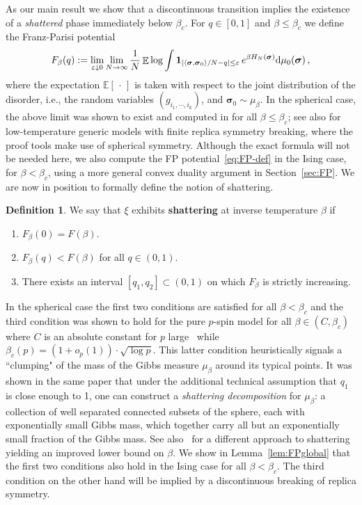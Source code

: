 \documentclass[11pt]{article}
\theoremstyle{definition}
\newtheorem{definition}{Definition}
\numberwithin{equation}{section}
\newcommand{\<}{\langle}
\renewcommand{\>}{\rangle}
\def\bsigma{{\boldsymbol{\sigma}}}
\def\bbE{{\mathbb{E}}}
\def\de{{\rm d}}
\DeclareMathOperator*{\E}{\bbE}
\def\eps{\varepsilon}
\def\one{{\mathbf{1}}}
\begin{document}
As our main result we show that a discontinuous transition implies the existence of a \emph{shattered} phase immediately below $\beta_c$. 
%
For $q \in [0,1]$ and $\beta\leq \beta_c$ we define the Franz-Parisi potential
\begin{equation}
\label{eq:FP-def}
F_{\beta}(q) := 
\lim_{\eps \downarrow 0} \lim_{N \to \infty} \frac{1}{N} 
\E \log \int \one_{| \langle \bsigma, \bsigma_0\rangle/N - q| \le \eps} \, e^{\beta H_N(\bsigma)} \de\mu_0( \bsigma)\, ,
\end{equation}
where the expectation $\bbE[\,\cdot\,]$ 
is taken with respect to the joint distribution of the disorder, i.e., the random variables $(g_{i_1,\cdots,i_k})$, and $\bsigma_0 \sim \mu_{\beta}$. 
%
In the spherical case, the above limit was shown to exist and computed in \cite{alaoui2023shattering} for all $\beta\leq \beta_c$; see also \cite{dembo2024disordered} for low-temperature generic models with finite replica symmetry breaking, where the proof tools make use of spherical symmetry. Although the exact formula will not be needed here, we also compute the FP potential~\eqref{eq:FP-def} in the Ising case, for $\beta<\beta_c$, using a more general convex duality argument in Section~\ref{sec:FP}.
%
We are now in position to formally define the notion of shattering. 
\begin{definition}\label{def:shattering}
We say that $\xi$ exhibits \textbf{shattering} at inverse temperature $\beta$ if
\begin{enumerate}
\item $F_{\beta}(0) = F(\beta)$.
\item $F_{\beta}(q) < F(\beta)$ for all $q \in (0,1)$.
\item There exists an interval $ [q_1 , q_2] \subset (0,1)$ on which $F_{\beta}$ is strictly increasing. 
\end{enumerate}
\end{definition}

In the spherical case the first two conditions are satisfied for all $\beta < \beta_c$ and the third condition was shown to hold for the pure $p$-spin model for all $\beta \in (C,\beta_c)$ where $C$ is an absolute constant for $p$ large~\cite{alaoui2023shattering} while $\beta_c(p)=(1+o_p(1))\cdot\sqrt{\log p}$. This latter condition heuristically signals a ``clumping" of the mass of the Gibbs measure $\mu_{\beta}$ around its typical points. It was shown in the same paper that under the additional technical assumption that $q_1$ is close enough to 1, one can construct a \emph{shattering decomposition} for $\mu_{\beta}$: a collection of well separated connected subsets of the sphere, each with exponentially small Gibbs mass, which together carry all but an exponentially small fraction of the Gibbs mass. See also~\cite{alaoui2024near} for a different approach to shattering yielding an improved lower bound on $\beta$.   
%
We show in Lemma~\ref{lem:FPglobal} that the first two conditions also hold in the Ising case for all $\beta<\beta_c$. The third condition on the other hand will be implied by a discontinuous breaking of replica symmetry.         
\end{document}
